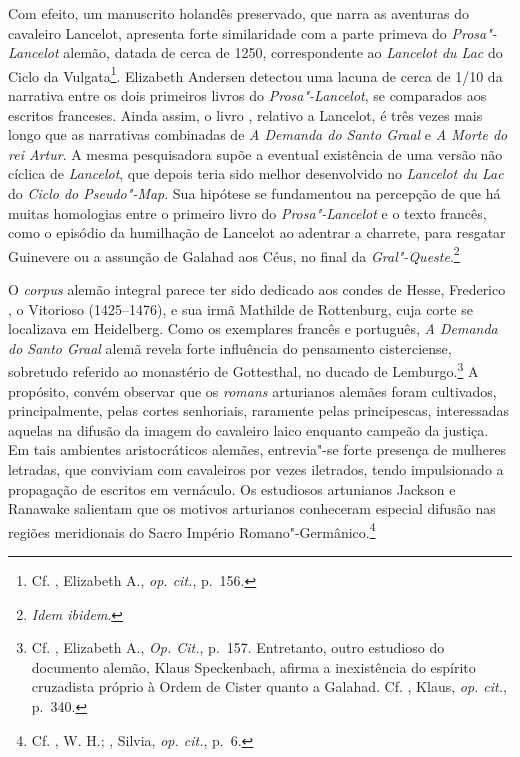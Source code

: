 Com efeito, um manuscrito holandês preservado, que narra as aventuras do
cavaleiro Lancelot, apresenta forte similaridade com a parte primeva do
\textit{Prosa"-Lancelot} alemão, datada de cerca de 1250, correspondente ao
\textit{Lancelot du Lac} do Ciclo da Vulgata\footnote{ Cf. , Elizabeth
A., \textit{op. cit.}, p.~156. }.  Elizabeth Andersen detectou uma lacuna de
cerca de 1/10 da narrativa entre os dois primeiros livros do
\textit{Prosa"-Lancelot}, se comparados aos escritos franceses. Ainda assim, o
livro , relativo a Lancelot, é três vezes mais longo que as narrativas
combinadas de \textit{A Demanda do Santo Graal }e \textit{A Morte do rei Artur}.
A mesma pesquisadora supõe a eventual existência de uma versão não cíclica de
\textit{Lancelot}, que depois teria sido melhor desenvolvido no \textit{Lancelot
du Lac} do \textit{Ciclo do Pseudo"-Map}. Sua hipótese se fundamentou na
percepção de que há muitas homologias entre o primeiro livro do
\textit{Prosa"-Lancelot} e o texto francês, como o episódio da humilhação de
Lancelot ao adentrar a charrete, para resgatar Guinevere ou a assunção de
Galahad aos Céus, no final da \textit{Gral"-Queste}.\footnote{ \textit{Idem
ibidem}. } 

O \textit{corpus} alemão integral parece ter sido dedicado aos condes de Hesse,
Frederico , o Vitorioso (1425--1476), e sua irmã Mathilde de Rottenburg, cuja
corte se localizava em Heidelberg. Como os exemplares francês e português, 
\textit{A Demanda do Santo Graal} alemã revela forte influência do pensamento
cisterciense, sobretudo referido ao monastério de Gottesthal, no ducado de
Lemburgo.\footnote{ Cf. , Elizabeth A., \textit{Op. Cit.}, p.~157.
Entretanto, outro estudioso do documento alemão, Klaus Speckenbach, afirma a
inexistência do espírito cruzadista próprio à Ordem de Cister quanto a Galahad.
Cf.  , Klaus, \textit{op. cit.}, p.~340. } A propósito, convém
observar que os \textit{romans} arturianos alemães foram cultivados,
principalmente, pelas cortes senhoriais, raramente pelas principescas,
interessadas aquelas na difusão da imagem do cavaleiro laico enquanto campeão da
justiça. Em tais ambientes aristocráticos alemães, entrevia"-se forte presença de
mulheres letradas, que conviviam com cavaleiros por vezes iletrados, tendo
impulsionado a propagação de escritos em vernáculo. Os estudiosos artunianos
Jackson e Ranawake salientam que os motivos arturianos conheceram especial
difusão nas regiões meridionais do Sacro Império Romano"-Germânico.\footnote{ Cf.
, W. H.; , Silvia,  \textit{op. cit.}, p.~6. } 

